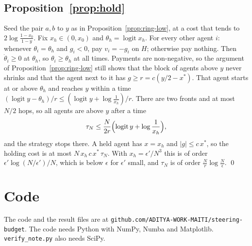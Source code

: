\documentclass[11pt,a4paper]{article}
\theoremstyle{definition}
\theoremstyle{plain}
\newcommand{\xs}{x^{*}}
\newcommand{\codeurl}{github.com/ADITYA-WORK-MAITI/steering-budget}
\begin{document}
\subsection{Proposition~\ref{prop:hold}}
Seed the pair $a,b$ to $y$ as in Proposition~\ref{prop:ring-low}, at a cost that tends to $2\log\frac{1-x_0}{1-y}$. Fix $x_h\in(0,x_0)$ and $\theta_h=\operatorname{logit}x_h$. For every other agent $i$: whenever $\theta_i=\theta_h$ and $g_i<0$, pay $v_i=-g_i$ on $H$; otherwise pay nothing. Then $\dot\theta_i\ge0$ at $\theta_h$, so $\theta_i\ge\theta_h$ at all times. Payments are non-negative, so the argument of Proposition~\ref{prop:ring-low} still shows that the block of agents above $y$ never shrinks and that the agent next to it has $g\ge r=c(y/2-\xs)$. That agent starts at or above $\theta_h$ and reaches $y$ within a time $(\operatorname{logit}y-\theta_h)/r\le(\operatorname{logit}y+\log\frac{1}{x_h})/r$. There are two fronts and at most $N/2$ hops, so all agents are above $y$ after a time
\[
\tau_N\le\frac{N}{2r}\Bigl(\operatorname{logit}y+\log\frac1{x_h}\Bigr),
\]
and the strategy stops there. A held agent has $x=x_h$ and $|g|\le c\,\xs$, so the holding cost is at most $N\,x_h\,c\,\xs\,\tau_N$. With $x_h=\epsilon'/N^{3}$ this is of order $\epsilon'\log(N/\epsilon')/N$, which is below $\epsilon$ for $\epsilon'$ small, and $\tau_N$ is of order $\frac Nr\log\frac N\epsilon$. \qed

\section{Code}\label{app:code}

The code and the result files are at \texttt{\codeurl}. The code needs Python with NumPy, Numba and Matplotlib. \texttt{verify\_note.py} also needs SciPy.
\end{document}

